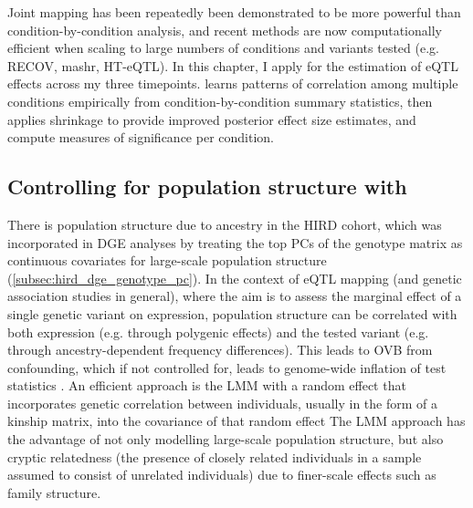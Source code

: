 Joint mapping has been repeatedly been demonstrated to be more powerful than condition-by-condition analysis,
and recent methods are now computationally efficient when scaling to large numbers of conditions and variants tested (e.g. RECOV\autocite{duong2017ApplyingMetaanalysisGenotypetissue}, mashr\autocite{urbut2018FlexibleStatisticalMethods}, HT-eQTL\autocite{li2018HTeQTLIntegrativeExpression}).
In this chapter, I apply \autocite{urbut2018FlexibleStatisticalMethods} for the estimation of \gls{eQTL} effects across my three timepoints.
 learns patterns of correlation among multiple conditions empirically from condition-by-condition summary statistics,
then applies shrinkage to provide improved posterior effect size estimates,
and compute measures of significance per condition. 

\subsection{Controlling for population structure with }

There is population structure due to ancestry in the \gls{HIRD} cohort,
which was incorporated in \gls{DGE} analyses by treating the top \glspl{PC} of the genotype matrix as continuous covariates for large-scale population structure (\autoref{subsec:hird_dge_genotype_pc}).
In the context of \gls{eQTL} mapping (and genetic association studies in general), 
where the aim is to assess the marginal effect of a single genetic variant on expression, 
population structure can be correlated with both expression (e.g. through polygenic effects)
and the tested variant (e.g. through ancestry-dependent frequency differences).
This leads to \gls{OVB} from confounding, which if not controlled for, leads to genome-wide inflation of test statistics \autocite{price2010NewApproachesPopulation}.
%
An efficient approach is the \gls{LMM} with a random effect that incorporates genetic correlation between individuals, usually in the form of a kinship matrix, into the covariance of that random effect\autocite{price2010NewApproachesPopulation, eu-ahsunthornwattana2014ComparisonMethodsAccount, golan2018MixedModelsCaseControl}
The \gls{LMM} approach has the advantage of not only modelling large-scale population structure, but also cryptic relatedness (the presence of closely related individuals in a sample assumed to consist of unrelated individuals\autocite{astle2009PopulationStructureCryptic}) due to finer-scale effects such as family structure\autocite{golan2018MixedModelsCaseControl}.

